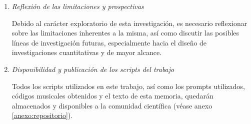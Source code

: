 \begin{enumerate}

    \item \emph{Reflexión de las limitaciones y prospectivas}

    Debido al carácter exploratorio de esta investigación, es necesario reflexionar sobre las limitaciones inherentes a la misma, así como discutir las posibles líneas de investigación futuras, especialmente hacia el diseño de investigaciones cuantitativas y de mayor alcance.

    \item \emph{Disponibilidad y publicación de los scripts del trabajo}

    Todos los scripts utilizados en este trabajo, así como los prompts utilizados, códigos musicales obtenidos y el texto de esta memoria, quedarán almacenados y disponibles a la comunidad científica (véase anexo \ref{anexo:repositorio}).

\end{enumerate}
